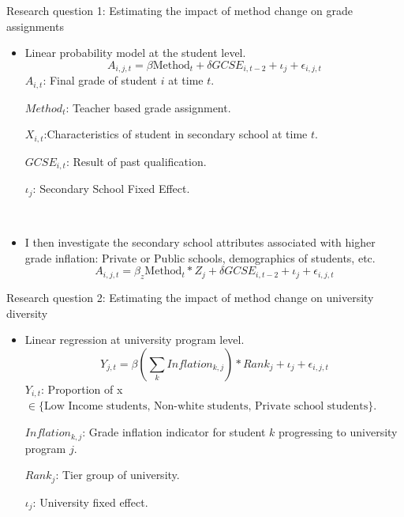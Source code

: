 \begin{frame}{Research question 1: Estimating the impact of method change on grade assignments}
\begin{itemize}
    \item Linear probability model at the student level.
\begin{equation*}
    A_{i,j,t} = \beta \text{Method}_{t}+\delta GCSE_{i,t-2}+\iota_j+\epsilon_{i,j,t}
\end{equation*}
    $A_{i,t}$: Final grade of student $i$ at time $t$.

    $Method_{t}$: Teacher based grade assignment.
    
    $X_{i,t}$:Characteristics of student in secondary school at time $t$.

    $GCSE_{i,t}$: Result of past qualification.
    
    $\iota_j$: Secondary School Fixed Effect.

    \

    \item I then investigate the secondary school attributes associated with higher grade inflation: Private or Public schools, demographics of students, etc.
    \begin{equation*}
        A_{i,j,t} = \beta_z \text{Method}_{t}*Z_{j}+\delta GCSE_{i,t-2}+\iota_j+\epsilon_{i,j,t}
    \end{equation*}
    \end{itemize}
\end{frame}

\begin{frame}{Research question 2: Estimating the impact of method change on university diversity}
\begin{itemize}
    \item Linear regression at university program level.
\begin{equation*}
    Y_{j,t} = \beta (\sum_k Inflation_{k,j}) * Rank_j + \iota_j+ \epsilon_{i,j,t}
\end{equation*}
    $Y_{i,t}$: Proportion of x$\in \{\text{Low Income students, Non-white students, Private school students}\}$.

    $Inflation_{k,j}$: Grade inflation indicator for student $k$ progressing to university program $j$.

    $Rank_j$: Tier group of university.
    
    $\iota_j$: University fixed effect.

    \

    \end{itemize}
\end{frame}

